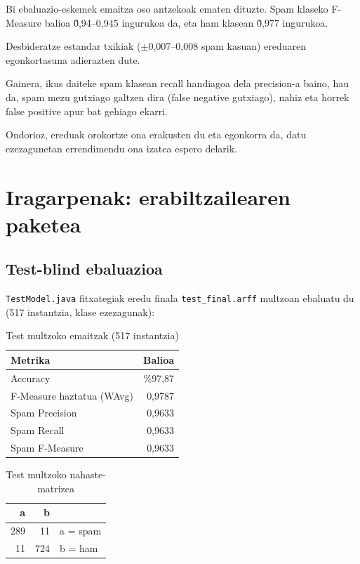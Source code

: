 \documentclass[12pt, a4paper]{article}
\begin{document}
Bi ebaluazio-eskemek emaitza oso antzekoak ematen dituzte.
Spam klaseko F-Measure balioa \~0,94--0,945 ingurukoa da,
eta ham klasean \~0,977 ingurukoa.

Desbideratze estandar txikiak ($\pm$0,007--0,008 spam kasuan)
ereduaren egonkortasuna adierazten dute.

Gainera, ikus daiteke spam klasean recall handiagoa dela precision-a baino,
hau da, spam mezu gutxiago galtzen dira (false negative gutxiago),
nahiz eta horrek false positive apur bat gehiago ekarri.

Ondorioz, ereduak orokortze ona erakusten du eta egonkorra da,
datu ezezagunetan errendimendu ona izatea espero delarik.
\newpage
\section{Iragarpenak: erabiltzailearen paketea}

\subsection{Test-blind ebaluazioa}

\texttt{TestModel.java} fitxategiak eredu finala \texttt{test\_final.arff}
multzoan ebaluatu du (517 instantzia, klase ezezagunak):

\begin{table}[H]
    \centering
    \caption{Test multzoko emaitzak (517 instantzia)}
    \begin{tabular}{lr}
        \toprule
        \textbf{Metrika} & \textbf{Balioa} \\
        \midrule
        Accuracy                    & \%97,87 \\
        F-Measure haztatua (WAvg)   & 0,9787  \\
        \midrule
        Spam Precision              & 0,9633  \\
        Spam Recall                 & 0,9633  \\
        Spam F-Measure              & 0,9633  \\
        \bottomrule
    \end{tabular}
    \label{tab:test}
\end{table}

\begin{table}[H]
    \centering
    \caption{Test multzoko nahaste-matrizea}
    \begin{tabular}{rr|l}
        \toprule
        \textbf{a} & \textbf{b} & \\
        \midrule
        289 & 11 & a = spam \\
        11  & 724 & b = ham \\
        \bottomrule
    \end{tabular}
\end{table}
\end{document}

